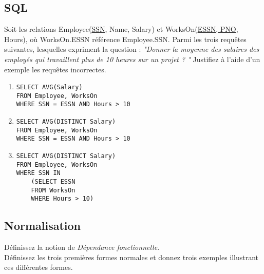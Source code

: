 \subsection{SQL}
Soit les relations Employee(\underline{SSN}, Name, Salary) et WorksOn(\underline{ESSN, PNO}, Hours), 
où WorksOn.ESSN référence Employee.SSN.
Parmi les trois requêtes suivantes, lesquelles expriment la question : 
\textit{"Donner la moyenne des salaires des employés qui travaillent plus de 10 heures sur un projet ? "} Justifiez à l'aide d'un exemple les requêtes incorrectes.\\
\begin{enumerate}
\item 
\begin{lstlisting}
SELECT AVG(Salary) 
FROM Employee, WorksOn
WHERE SSN = ESSN AND Hours > 10 
\end{lstlisting}
\item 
\begin{lstlisting}
SELECT AVG(DISTINCT Salary) 
FROM Employee, WorksOn
WHERE SSN = ESSN AND Hours > 10 
\end{lstlisting}	
\item 
\begin{lstlisting}
SELECT AVG(DISTINCT Salary) 
FROM Employee, WorksOn
WHERE SSN IN 
	(SELECT ESSN 
	FROM WorksOn 
	WHERE Hours > 10) 
\end{lstlisting}
\end{enumerate}



\subsection{Normalisation}
Définissez la notion de \textit{Dépendance fonctionnelle}.\\
Définissez les trois premières formes normales et donnez trois exemples 
illustrant ces différentes formes.


